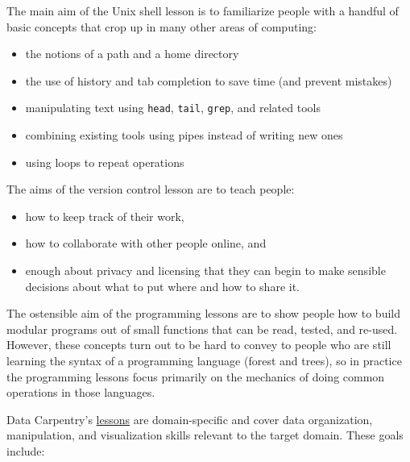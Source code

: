 The main aim of the Unix shell lesson is to familiarize people with a
handful of basic concepts that crop up in many other areas of computing:

\begin{itemize}
\item
  the notions of a path and a home directory
\item
  the use of history and tab completion to save time (and prevent
  mistakes)
\item
  manipulating text using \texttt{head}, \texttt{tail}, \texttt{grep},
  and related tools
\item
  combining existing tools using pipes instead of writing new ones
\item
  using loops to repeat operations
\end{itemize}

The aims of the version control lesson are to teach people:

\begin{itemize}
\item
  how to keep track of their work,
\item
  how to collaborate with other people online, and
\item
  enough about privacy and licensing that they can begin to make
  sensible decisions about what to put where and how to share it.
\end{itemize}

The ostensible aim of the programming lessons are to show people how to
build modular programs out of small functions that can be read, tested,
and re-used. However, these concepts turn out to be hard to convey to
people who are still learning the syntax of a programming language
(forest and trees), so in practice the programming lessons focus
primarily on the mechanics of doing common operations in those
languages.


Data Carpentry's \href{http://datacarpentry.org/lessons/}{lessons}
are domain-specific and cover data organization, manipulation, and
visualization skills relevant to the target domain. These goals include:

